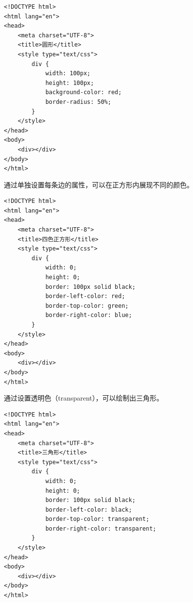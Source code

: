 \begin{lstlisting}[style=htmlcssjs, title=圆形]
<!DOCTYPE html>
<html lang="en">
<head>
    <meta charset="UTF-8">
    <title>圆形</title>
    <style type="text/css">
        div {
            width: 100px;
            height: 100px;
            background-color: red;
            border-radius: 50%;
        }
    </style>
</head>
<body>
    <div></div>
</body>
</html>
\end{lstlisting}

通过单独设置每条边的属性，可以在正方形内展现不同的颜色。

\begin{figure}[H]
    \centering
\end{figure}

\begin{lstlisting}[style=htmlcssjs, title=四色正方形]
<!DOCTYPE html>
<html lang="en">
<head>
    <meta charset="UTF-8">
    <title>四色正方形</title>
    <style type="text/css">
        div {
            width: 0;
            height: 0;
            border: 100px solid black;
            border-left-color: red;
            border-top-color: green;
            border-right-color: blue;
        }
    </style>
</head>
<body>
    <div></div>
</body>
</html>
\end{lstlisting}

通过设置透明色（transparent），可以绘制出三角形。

\begin{figure}[H]
    \centering
\end{figure}

\begin{lstlisting}[style=htmlcssjs, title=三角形]
<!DOCTYPE html>
<html lang="en">
<head>
    <meta charset="UTF-8">
    <title>三角形</title>
    <style type="text/css">
        div {
            width: 0;
            height: 0;
            border: 100px solid black;
            border-left-color: black;
            border-top-color: transparent;
            border-right-color: transparent;
        }
    </style>
</head>
<body>
    <div></div>
</body>
</html>
\end{lstlisting}

